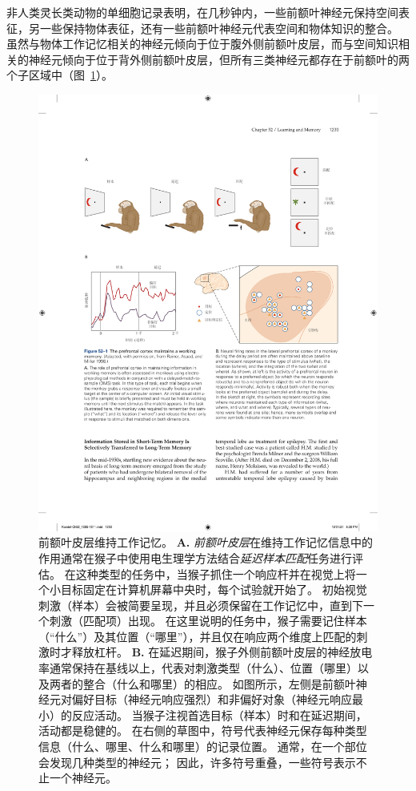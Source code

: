 非人类灵长类动物的单细胞记录表明，在几秒钟内，一些前额叶神经元保持空间表征，另一些保持物体表征，还有一些前额叶神经元代表空间和物体知识的整合。
虽然与物体工作记忆相关的神经元倾向于位于腹外侧前额叶皮层，而与空间知识相关的神经元倾向于位于背外侧前额叶皮层，但所有三类神经元都存在于前额叶的两个子区域中（图~\ref{fig:52_1}）。


\begin{figure}[htbp]
	\centering
	\includegraphics[width=1.0\linewidth]{chap52/fig_52_1}
	\caption{前额叶皮层维持工作记忆\cite{rainer1998memory}。
		\textbf{A.} \textit{前额叶皮层}在维持工作记忆信息中的作用通常在猴子中使用电生理学方法结合\textit{延迟样本匹配}任务进行评估。
		在这种类型的任务中，当猴子抓住一个响应杆并在视觉上将一个小目标固定在计算机屏幕中央时，每个试验就开始了。
		初始视觉刺激（样本）会被简要呈现，并且必须保留在工作记忆中，直到下一个刺激（匹配项）出现。
		在这里说明的任务中，猴子需要记住样本（“什么”）及其位置（“哪里”），并且仅在响应两个维度上匹配的刺激时才释放杠杆。
		\textbf{B.} 在延迟期间，猴子外侧前额叶皮层的神经放电率通常保持在基线以上，代表对刺激类型（什么）、位置（哪里）以及两者的整合（什么和哪里）的相应。
		如图所示，左侧是前额叶神经元对偏好目标（神经元响应强烈）和非偏好对象（神经元响应最小）的反应活动。
		当猴子注视首选目标（样本）时和在延迟期间，活动都是稳健的。
		在右侧的草图中，符号代表神经元保存每种类型信息（什么、哪里、什么和哪里）的记录位置。
		通常，在一个部位会发现几种类型的神经元；
		因此，许多符号重叠，一些符号表示不止一个神经元。}
	\label{fig:52_1}
\end{figure}


